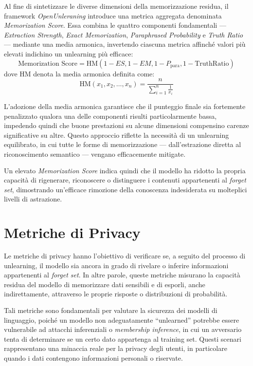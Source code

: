Al fine di sintetizzare le diverse dimensioni della memorizzazione residua, il framework \textit{OpenUnleraning}\cite{openunlearning2025} introduce una metrica aggregata denominata \textit{Memorization Score}.  
Essa combina le quattro componenti fondamentali — \textit{Extraction Strength}, \textit{Exact Memorization}, \textit{Paraphrased Probability} e \textit{Truth Ratio} — mediante una media armonica, invertendo ciascuna metrica affinché valori più elevati indichino un unlearning più efficace:
\[
\text{Memorization Score} = \text{HM}(1 - ES, 1 - EM, 1 - P_{\text{para}}, 1 - \text{TruthRatio})
\]
dove \( \text{HM} \) denota la media armonica definita come:
\[
\text{HM}(x_1, x_2, \ldots, x_n) = \frac{n}{\sum_{i=1}^{n} \frac{1}{x_i}}
\]

L'adozione della media armonica garantisce che il punteggio finale sia fortemente penalizzato qualora una delle componenti risulti particolarmente bassa, impedendo quindi che buone prestazioni su alcune dimensioni compensino carenze significative su altre.  
Questo approccio riflette la necessità di un unlearning equilibrato, in cui tutte le forme di memorizzazione — dall'estrazione diretta al riconoscimento semantico — vengano efficacemente mitigate.

Un elevato \textit{Memorization Score} indica quindi che il modello ha ridotto la propria capacità di rigenerare, riconoscere o distinguere i contenuti appartenenti al \textit{forget set}, dimostrando un'efficace rimozione della conoscenza indesiderata su molteplici livelli di astrazione.

\section{Metriche di Privacy}

Le metriche di privacy hanno l'obiettivo di verificare se, a seguito del processo di unlearning, il modello sia ancora in grado di rivelare o inferire informazioni appartenenti al \textit{forget set}.  
In altre parole, queste metriche misurano la capacità residua del modello di memorizzare dati sensibili e di esporli, anche indirettamente, attraverso le proprie risposte o distribuzioni di probabilità.  

Tali metriche sono fondamentali per valutare la sicurezza dei modelli di linguaggio, poiché un modello non adeguatamente “unlearned” potrebbe essere vulnerabile ad attacchi inferenziali o \textit{membership inference}, in cui un avversario tenta di determinare se un certo dato appartenga al training set. Questi scenari rappresentano una minaccia reale per la privacy degli utenti, in particolare quando i dati contengono informazioni personali o riservate.  


